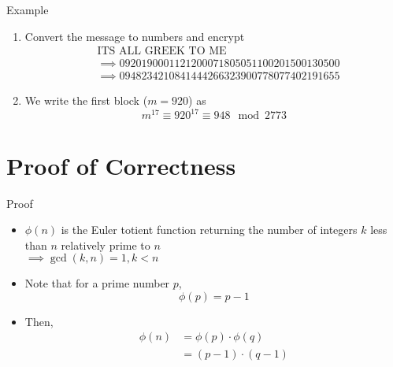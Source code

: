 \documentclass[handout, aspectratio=169]{beamer}
\begin{document}
\begin{frame}{Example}
\begin{enumerate}
\item Convert the message to numbers and encrypt
    \begin{equation*}
    \begin{split}
        &\text{ITS ALL GREEK TO ME} \\
        &\implies 0920 1900 0112 1200 0718 0505 1100 2015 0013 0500 \\
        &\implies 0948 2342 1084 1444 2663 2390 0778 0774 0219 1655
    \end{split}
    \end{equation*}
    \item We write the first block ($m = 920$) as
    \begin{equation*}
        m^{17} \equiv 920^{17} \equiv 948 \mod 2773
    \end{equation*}
\end{enumerate}
\end{frame}

\section{Proof of Correctness}
\frame{\sectionpage}

\begin{frame}{Proof}
    \begin{itemize}
        \item $\phi(n)$ is the Euler totient function returning the number of integers $k$ less than $n$ relatively prime to $n$ \\
        $\implies \gcd(k, n) = 1, k < n$
        \item Note that for a prime number $p$,
        \begin{equation*}
            \phi(p) = p - 1
        \end{equation*}
        \item Then,
        \begin{equation*}
        \begin{split}
            \phi(n) &= \phi(p) \cdot \phi(q) \\
            &= (p - 1) \cdot (q - 1)
        \end{split}
        \end{equation*}
    \end{itemize}
\end{frame}
\end{document}
